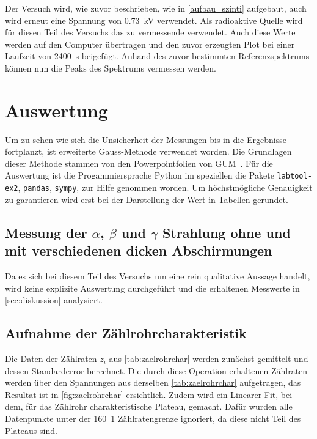 \documentclass[12pt,english,ngerman]{scrartcl}
\begin{document}
Der Versuch wird, wie zuvor beschrieben, wie in \autoref{aufbau_szinti}
aufgebaut, auch wird erneut eine Spannung von \SI{0.73}{\kilo\volt} verwendet.
Als radioaktive Quelle wird für diesen Teil des Versuchs das zu vermessende
 verwendet. Auch diese Werte werden auf den Computer
übertragen und den zuvor erzeugten Plot bei einer Laufzeit von
\SI{2400}{\second} beigefügt. Anhand des zuvor bestimmten Referenzspektrums
können nun die Peaks des  Spektrums vermessen werden.

\section{Auswertung}\label{sec:Auswertung}

Um zu sehen wie sich die Unsicherheit der Messungen bis in die Ergebnisse
fortplanzt, ist erweiterte Gauss-Methode verwendet worden. Die Grundlagen
dieser Methode stammen von den Powerpointfolien von
GUM~\cite{WolfgangKessel2004}. Für die Auswertung ist die Progammiersprache
Python im speziellen die Pakete \verb#labtool-ex2#, \verb#pandas#,
\verb#sympy#, zur Hilfe genommen worden. Um höchstmögliche Genauigkeit zu
garantieren wird erst bei der Darstellung der Wert in Tabellen gerundet.

\subsection{Messung der \texorpdfstring{$\alpha$}{alpha}, \texorpdfstring{$\beta$}{beta} und
	\texorpdfstring{$\gamma$}{gamma} Strahlung ohne und mit verschiedenen dicken Abschirmungen}

Da es sich bei diesem Teil des Versuchs um eine rein qualitative Aussage
handelt, wird keine explizite Auswertung durchgeführt und die erhaltenen
Messwerte in \autoref{sec:diskussion} analysiert.

\subsection{Aufnahme der Zählrohrcharakteristik}

Die Daten der Zählraten $z_i$ aus \autoref{tab:zaelrohrchar} werden zunächst
gemittelt und dessen Standarderror berechnet. Die durch diese Operation
erhaltenen Zählraten werden über den Spannungen aus derselben
\autoref{tab:zaelrohrchar} aufgetragen, das Resultat ist in
\autoref{fig:zaelrohrchar} ersichtlich. Zudem wird ein Linearer Fit, bei dem,
für das Zählrohr charakteristische Plateau, gemacht. Dafür wurden alle
Datenpunkte unter der \SI{160}{1} Zählratengrenze ignoriert, da diese nicht
Teil des Plateaus sind.
\end{document}
